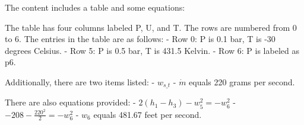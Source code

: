 The content includes a table and some equations:

The table has four columns labeled P, U, and T. The rows are numbered from 0 to 6. The entries in the table are as follows:
- Row 0: P is 0.1 bar, T is -30 degrees Celsius.
- Row 5: P is 0.5 bar, T is 431.5 Kelvin.
- Row 6: P is labeled as p6.

Additionally, there are two items listed:
- \( w_{s\_t} \)
- \( \dot{m} \) equals 220 grams per second.

There are also equations provided:
- \( 2(h_1 - h_3) - w_5^2 = -w_6^2 \)
- \( -208 - \frac{220^2}{2} = -w_6^2 \)
- \( w_6 \) equals 481.67 feet per second.